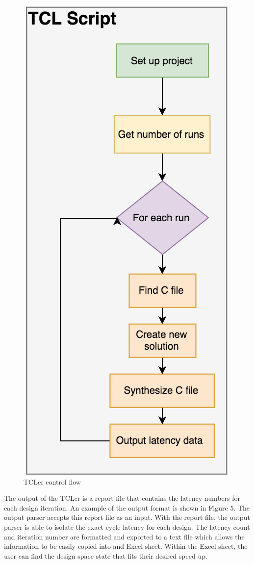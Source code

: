 \documentclass[letterpaper, 10 pt, conference]{IEEEconf}  %
\begin{document}
\begin{figure}[H]
\centering
\includegraphics[scale=.6]{tcler.png} 
\caption{TCLer control flow}
\end{figure}

The output of the TCLer is a report file that contains the latency numbers for each design iteration. An example of the output format is shown in Figure 5. The output parser accepts this report file as an input. With the report file, the output parser is able to isolate the exact cycle latency for each design. The latency count and iteration number are formatted and exported to a text file which allows the information to be easily copied into and Excel sheet. Within the Excel sheet, the user can find the design space state that fits their desired speed up.
\end{document}
